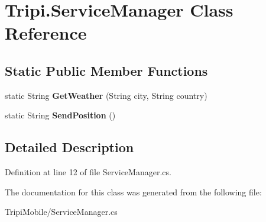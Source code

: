 \hypertarget{class_tripi_1_1_service_manager}{
\section{Tripi.ServiceManager Class Reference}
\label{class_tripi_1_1_service_manager}
}
\subsection*{Static Public Member Functions}
\begin{DoxyCompactItemize}
\item 
\hypertarget{class_tripi_1_1_service_manager_ac4bd1ca0e3d7bd83993c74f3672d52e5}{
static String {\bfseries GetWeather} (String city, String country)}
\label{class_tripi_1_1_service_manager_ac4bd1ca0e3d7bd83993c74f3672d52e5}

\item 
\hypertarget{class_tripi_1_1_service_manager_aa9932510b6b38d6da158e4380444594b}{
static String {\bfseries SendPosition} ()}
\label{class_tripi_1_1_service_manager_aa9932510b6b38d6da158e4380444594b}

\end{DoxyCompactItemize}


\subsection{Detailed Description}


Definition at line 12 of file ServiceManager.cs.

The documentation for this class was generated from the following file:\begin{DoxyCompactItemize}
\item 
TripiMobile/ServiceManager.cs\end{DoxyCompactItemize}
